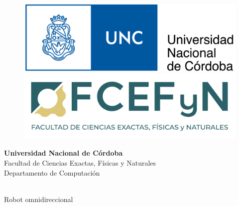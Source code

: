 
\thispagestyle{empty}
\begin{center}
    \begin{figure} \begin{minipage}{.42\textwidth}
        \includegraphics[scale=0.11]{images/logo_unc.png}
    \end{minipage}
    \hfill
    \begin{minipage}{.6\textwidth}
        \vspace{0.05cm}
        \includegraphics[scale=0.28]{images/logo_FCEFyN.png}
    \end{minipage}\end{figure}
    
    \vspace{1cm}

    \begin{LARGE}
        \textbf{Universidad Nacional de Córdoba} \\
        \vspace{0.3cm}
        Facultad de Ciencias Exactas, Físicas y Naturales \\
        \vspace{0.3cm}
        Departamento de Computación \\
    \end{LARGE}
    
    \vspace{2cm}

    \begin{Huge}
        \textbf{\newtitle} \\
        \vspace{0.3cm}
        Robot omnidireccional \\
    \end{Huge}


\end{center}

